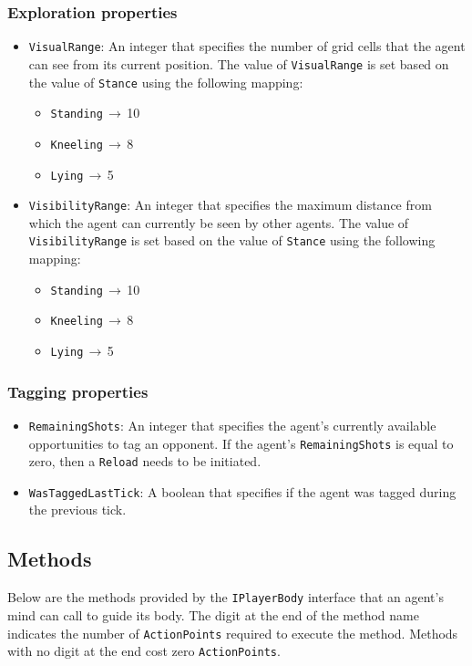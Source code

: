 \documentclass[
  a4paper,
  english,
  DIV=16,
  11pt,
  parskip=half,
  dvipsnames,
  listof=totoc,		     %
  index=totoc,		     %
  bibliography=totoc,	 %
]{scrartcl}
\begin{document}
\subsubsection{Exploration properties} \label{sssec:explAttr}
\begin{itemize}
  \item \texttt{VisualRange}: An integer that specifies the number of grid cells that the agent can see from its current position. The value of \texttt{VisualRange} is set based on the value of \texttt{Stance} using the following mapping:
  \begin{itemize}
    \item \texttt{Standing}$\,\to\,$10
    \item \texttt{Kneeling}$\,\to\,$8
    \item \texttt{Lying}$\,\to\,$5
  \end{itemize}
  \item \texttt{VisibilityRange}: An integer that specifies the maximum distance from which the agent can currently be seen by other agents. The value of \texttt{VisibilityRange} is set based on the value of \texttt{Stance} using the following mapping:
  \begin{itemize}
    \item \texttt{Standing}$\,\to\,$10
    \item \texttt{Kneeling}$\,\to\,$8
    \item \texttt{Lying}$\,\to\,$5
  \end{itemize}
\end{itemize}
%
\subsubsection{Tagging properties} \label{sssec:tagAttr}
\begin{itemize}
  \item \texttt{RemainingShots}: An integer that specifies the agent's currently available opportunities to tag an opponent. If the agent's \texttt{RemainingShots} is equal to zero, then a \texttt{Reload} needs to be initiated.
  \item \texttt{WasTaggedLastTick}: A boolean that specifies if the agent was tagged during the previous tick.
\end{itemize}
%
\subsection{Methods} \label{ssec:methods}
Below are the methods provided by the \texttt{IPlayerBody} interface that an agent's mind can call to guide its body. The digit at the end of the method name indicates the number of \texttt{ActionPoints} required to execute the method. Methods with no digit at the end cost zero \texttt{ActionPoints}.
%
\end{document}
